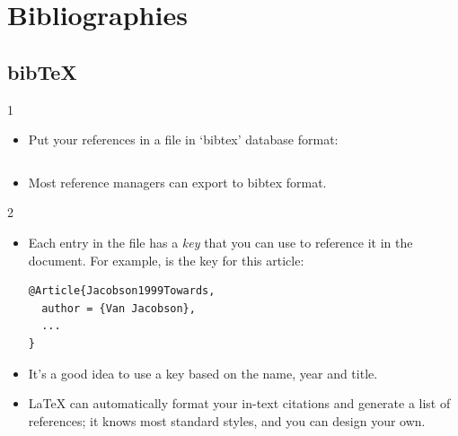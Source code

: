 \documentclass[aspectratio=169]{beamer}
\begin{document}
\section{Bibliographies}


\subsection{bib\TeX}
\begin{frame}[fragile]{\insertsubsection{} 1}
\begin{itemize}
\item Put your references in a  file in `bibtex' database format:
\inputminted[fontsize=\scriptsize,frame=single]{latex}{bib-example.bib}
\item Most reference managers can export to bibtex format.
\end{itemize}
\end{frame}

\begin{frame}[fragile]{\insertsubsection{} 2}
\begin{itemize}
\item Each entry in the  file has a \emph{key} that you can use to
reference it in the document. For example,  is the key for this article:
\begin{verbatim}
@Article{Jacobson1999Towards,
  author = {Van Jacobson},
  ...
}
\end{verbatim}
\item It's a good idea to use a key based on the name, year and title.
\item \LaTeX{} can automatically format your in-text citations and generate a
list of references; it knows most standard styles, and you can design your own.
\end{itemize}
\end{frame}
\end{document}
